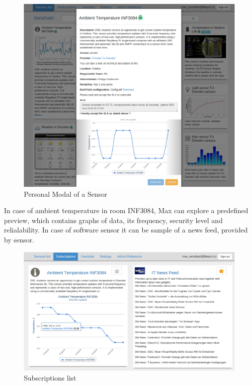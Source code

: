 \begin{figure}[!ht]
\centering
\includegraphics[scale=0.5]{Screenshots/UseCaseWelcome.png}   
\caption[Personal Modal of a Sensor]{Personal Modal of a Sensor}
\label{img:modal}                       
\end{figure}
 
 In case of ambient temperature in room INF3084, Max can explore a predefined preview, which contains graphs of data, its frequency, security level and relialability. In case of software sensor it can be sample of a news feed, provided by sensor. 

\begin{figure}[!ht]
\centering
\includegraphics[scale=0.5]{Screenshots/UseCaseScreenshot4.png}   
\caption[Personal Subscribed Sensor]{Subscriptions list} 
\label{img:subscriptions}                        
\end{figure}

